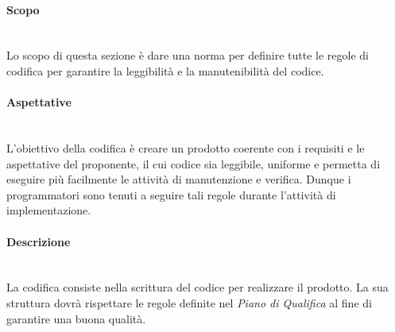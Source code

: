\paragraph*{Scopo}\mbox{}\\ [1mm]
Lo scopo di questa sezione è dare una norma per definire tutte le regole di codifica per garantire la leggibilità e la manutenibilità del codice.
\paragraph*{Aspettative}\mbox{}\\ [1mm]
L'obiettivo della codifica è creare un prodotto coerente con i requisiti e le aspettative del proponente, il cui codice sia leggibile, uniforme e permetta di eseguire più facilmente le attività di manutenzione e verifica. Dunque i programmatori sono tenuti a seguire tali regole durante l'attività di implementazione.
\paragraph*{Descrizione}\mbox{}\\ [1mm]
La codifica consiste nella scrittura del codice per realizzare il prodotto\glo. La sua struttura dovrà rispettare le regole definite nel \textit{Piano di Qualifica} al fine di garantire una buona qualità.

